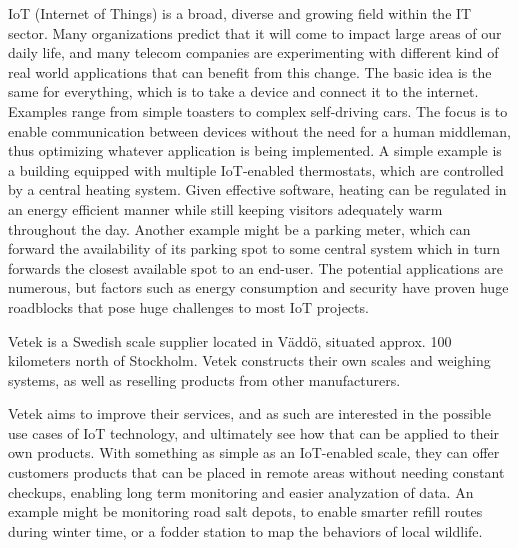 






IoT (Internet of Things) is a broad, diverse and growing field within the IT sector. Many organizations predict that it will come to impact large areas of our daily life, and many telecom companies are experimenting with different kind of real world applications that can benefit from this change. The basic idea is the same for everything, which is to take a device and connect it to the internet. Examples range from simple toasters to complex self-driving cars.\cite{what_is_iot} The focus is to enable communication between devices without the need for a human middleman, thus optimizing whatever application is being implemented. A simple example is a building equipped with multiple IoT-enabled thermostats, which are controlled by a central heating system. Given effective software, heating can be regulated in an energy efficient manner while still keeping visitors adequately warm throughout the day. Another example might be a parking meter, which can forward the availability of its parking spot to some central system which in turn forwards the closest available spot to an end-user. The potential applications are numerous, but factors such as energy consumption and security have proven huge roadblocks that pose huge challenges to most IoT projects.

Vetek is a Swedish scale supplier located in Väddö, situated approx. 100 kilometers north of Stockholm. Vetek constructs their own scales and weighing systems, as well as reselling products from other manufacturers.\cite{vetek} 

Vetek aims to improve their services, and as such are interested in the possible use cases of IoT technology, and ultimately see how that can be applied to their own products. With something as simple as an IoT-enabled scale, they can offer customers products that can be placed in remote areas without needing constant checkups, enabling long term monitoring and easier analyzation of data. An example might be monitoring road salt depots, to enable smarter refill routes during winter time, or a fodder station to map the behaviors of local wildlife.

